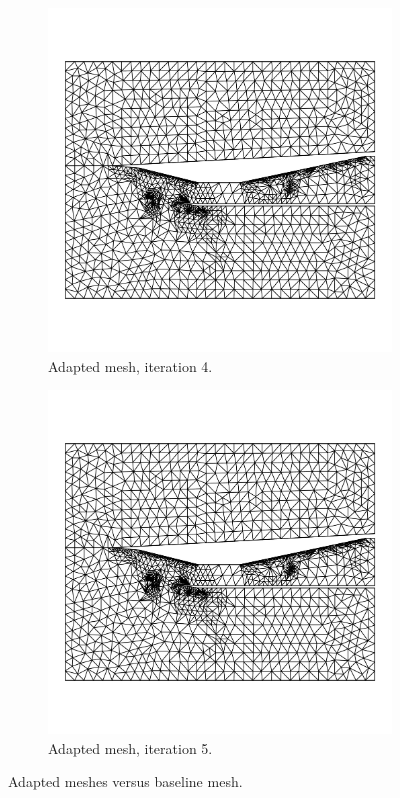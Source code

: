 \begin{figure}[h!]
    \begin{subfigure}[h]{0.39\linewidth}
        \centering
        \includegraphics[width=\linewidth]{rep/q4/mesh4.pdf}
        \caption{Adapted mesh, iteration 4.}
    \end{subfigure}
    \begin{subfigure}[h]{0.39\linewidth}
        \centering
        \includegraphics[width=\linewidth]{rep/q4/mesh5.pdf}
        \caption{Adapted mesh, iteration 5.}
    \end{subfigure}
    \caption[Adapted Meshes Versus Baseline Mesh]{Adapted meshes versus baseline mesh.}
    \label{fig:adapted_meshes}
\end{figure}



